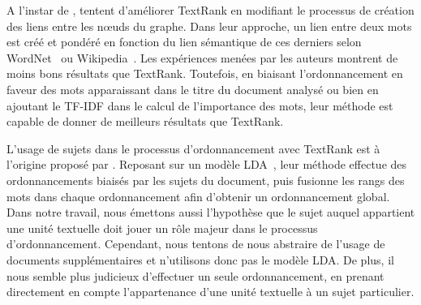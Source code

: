     A l'instar de ,
     tentent d'améliorer TextRank en
    modifiant le processus de création des liens entre les n\oe{}uds du graphe.
    Dans leur approche, un lien entre deux mots est créé et pondéré en fonction
    du lien sémantique de ces derniers selon WordNet~\cite{miller1995wordnet} ou
    Wikipedia~\cite{milne2008wikipediasemanticrelatedness}. Les expériences
    menées par les auteurs montrent de moins bons résultats que TextRank.
    Toutefois, en biaisant l'ordonnancement en faveur des mots apparaissant dans
    le titre du document analysé ou bien en ajoutant le TF-IDF dans le calcul de
    l'importance des mots, leur méthode est capable de donner de meilleurs
    résultats que TextRank.

    L'usage de sujets dans le processus d'ordonnancement avec TextRank est à
    l'origine proposé par . Reposant sur un
    modèle LDA~\cite[Latent Dirichlet Allocation]{blei2003lda}, leur méthode
    effectue des ordonnancements biaisés par les sujets du document, puis
    fusionne les rangs des mots dans chaque ordonnancement afin d'obtenir un
    ordonnancement global. Dans notre travail, nous émettons aussi l'hypothèse
    que le sujet auquel appartient une unité textuelle doit jouer un rôle majeur
    dans le processus d'ordonnancement. Cependant, nous tentons de nous
    abstraire de l'usage de documents supplémentaires et n'utilisons donc pas le
    modèle LDA. De plus, il nous semble plus judicieux d'effectuer un seule
    ordonnancement, en prenant directement en compte l'appartenance d'une unité
    textuelle à un sujet particulier.

